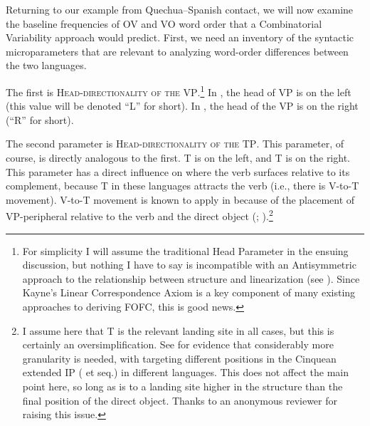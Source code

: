 \documentclass[output=paper]{langsci/langscibook}
\begin{document}
Returning to our example from Quechua--Spanish contact, we will now examine the
baseline frequencies of OV and VO word order that a Combinatorial Variability
approach would predict.  First, we need an inventory of the syntactic
microparameters that are relevant to analyzing word-order differences between
the two languages.%

The first is \textsc{Head-directionality of the VP}.\footnote{For simplicity I
    will assume the traditional Head Parameter in the ensuing discussion, but
    nothing I have to say is incompatible with an Antisymmetric approach to the
    relationship between structure and linearization (see \citealt{Kayne1994}).
Since Kayne’s Linear Correspondence Axiom is a key component of many existing
approaches to deriving FOFC, this is good news.}  In , the head of VP is
on the left (this value will be denoted \enquote{L} for short).   In , the head
of the VP is on the right (\enquote{R} for short).

The second parameter is \textsc{Head-directionality of the TP}.  This
parameter, of course, is directly analogous to the first.   T is on the
left, and  T is on the right.  This parameter has a direct influence on
where the verb surfaces relative to its complement, because T in these
languages attracts the verb (i.e., there is V-to-T movement).  V-to-T movement
is known to apply in  because of the placement of VP-peripheral 
relative to the verb and the direct object (\citealt{Pollock1989};
\citealt{Zagona2002}).\footnote{I assume here that T is the relevant landing
    site in all cases, but this is certainly an oversimplification.  See
    \textcite{Schifano2015,Schifano2018} for evidence that considerably more
    granularity is needed, with  targeting different positions in
    the Cinquean extended IP (\citealt{Cinque1999} et seq.) in different
    languages.  This does not affect the main point here, so long as
     is to a landing site higher in the structure than the final position
of the direct object.  Thanks to an anonymous reviewer for raising this
issue.}
\end{document}
